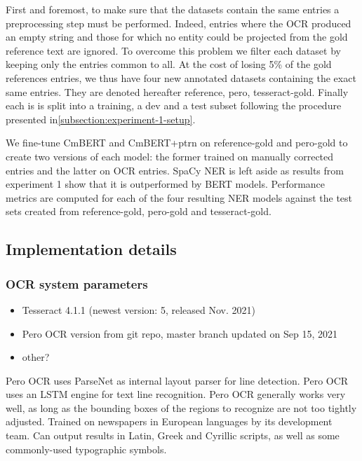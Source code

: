 First and foremost, to make sure that the datasets contain the same entries a preprocessing step must be performed.
Indeed, entries where the OCR produced an empty string and those for which no entity could be projected from the gold reference text are ignored.
To overcome this problem we filter each dataset by keeping only the entries common to all.
At the cost of losing  5\% of the gold references entries, we thus have four new annotated datasets containing the exact same entries.
They are denoted hereafter {reference, pero, tesseract}-gold.
Finally each is is split into a training, a dev and a test subset following the procedure presented in\cref{subsection:experiment-1-setup}.

We fine-tune CmBERT and CmBERT+ptrn on reference-gold and pero-gold to create two versions of each model: the former trained on manually corrected entries and the latter on OCR entries.
SpaCy NER is left aside as results from experiment 1 show that it is outperformed by BERT models.
Performance metrics are computed for each of the four resulting NER models against the test sets created from reference-gold, pero-gold and tesseract-gold.

\subsection{Implementation details}

\subsubsection{OCR system parameters}
\begin{itemize}
    \item Tesseract 4.1.1 (newest version: 5, released Nov. 2021)
    \item Pero OCR version from git repo, master branch updated on Sep 15, 2021 %
    \item other?  %
\end{itemize}

Pero OCR uses ParseNet  as internal layout parser for line detection.
Pero OCR uses an LSTM engine  for text line recognition.
Pero OCR generally works very well, as long as the bounding boxes of the regions to recognize are not too tightly adjusted.
Trained on newspapers in European languages by its development team.
Can output results in Latin, Greek and Cyrillic scripts, as well as some commonly-used typographic symbols.

